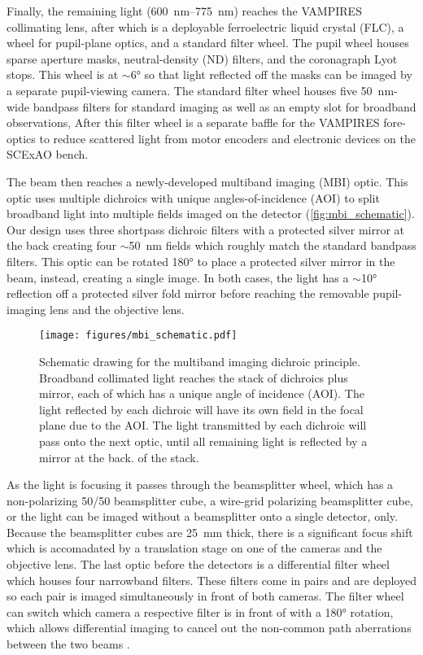 Finally, the remaining light (\SIrange{600}{775}{\nano\meter}) reaches the VAMPIRES collimating lens, after which is a deployable ferroelectric liquid crystal (FLC), a wheel for pupil-plane optics, and a standard filter wheel. The pupil wheel houses sparse aperture masks, neutral-density (ND) filters, and the coronagraph Lyot stops. This wheel is at $\sim$\ang{6} so that light reflected off the masks can be imaged by a separate pupil-viewing camera. The standard filter wheel houses five \SI{50}{\nano\meter}-wide bandpass filters for standard imaging as well as an empty slot for broadband observations, After this filter wheel is a separate baffle for the VAMPIRES fore-optics to reduce scattered light from motor encoders and electronic devices on the SCExAO bench. 

The beam then reaches a newly-developed multiband imaging (MBI) optic. This optic uses multiple dichroics with unique angles-of-incidence (AOI) to split broadband light into multiple fields imaged on the detector (\autoref{fig:mbi_schematic}). Our design uses three shortpass dichroic filters with a protected silver mirror at the back creating four $\sim$\SI{50}{\nano\meter} fields which roughly match the standard bandpass filters. This optic can be rotated \ang{180} to place a protected silver mirror in the beam, instead, creating a single image. In both cases, the light has a $\sim$\ang{10} reflection off a protected silver fold mirror before reaching the removable pupil-imaging lens and the objective lens.

\begin{figure}
    \centering
    \texttt{[image: figures/mbi\_schematic.pdf]}
    \caption{Schematic drawing for the multiband imaging dichroic principle. Broadband collimated light reaches the stack of dichroics plus mirror, each of which has a unique angle of incidence (AOI). The light reflected by each dichroic will have its own field in the focal plane due to the AOI. The light transmitted by each dichroic will pass onto the next optic, until all remaining light is reflected by a mirror at the back. of the stack.\label{fig:mbi_schematic}}
\end{figure}

As the light is focusing it passes through the beamsplitter wheel, which has a non-polarizing 50/50 beamsplitter cube, a wire-grid polarizing beamsplitter cube, or the light can be imaged without a beamsplitter onto a single detector, only. Because the beamsplitter cubes are \SI{25}{\milli\meter} thick, there is a significant focus shift which is accomadated by a translation stage on one of the cameras and the objective lens. The last optic before the detectors is a differential filter wheel which houses four narrowband filters. These filters come in pairs and are deployed so each pair is imaged simultaneously in front of both cameras. The filter wheel can switch which camera a respective filter is in front of with a \ang{180} rotation, which allows differential imaging to cancel out the non-common path aberrations between the two beams \citep{uyama_high-contrast_2020}.

